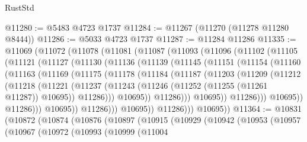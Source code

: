 \begin{lexlean}{RustStd}
\begin{coremodule}
@11280 := @5483 @4723 @1737
@11284 := @11267 (@11270 (@11278 @11280 @8444))
@11286 := @5033 @4723 @1737
@11287 := @11284 @11286
@11335 := @11069
    (@11072
      (@11078
        (@11081
          (@11087
            (@11093
              (@11096
                (@11102
                  (@11105
                    (@11121
                      (@11127
                        (@11130
                          (@11136
                            (@11139
                              (@11145
                                (@11151
                                  (@11154
                                    (@11160
                                      (@11163
                                        (@11169
                                          (@11175
                                            (@11178
                                              (@11184
                                                (@11187
                                                  (@11203
                                                    (@11209
                                                      (@11212
                                                        (@11218
                                                          (@11221
                                                            (@11237
                                                              (@11243
                                                                (@11246
                                                                  (@11252
                                                                    (@11255 (@11261 @11287))
                                                                    @10695))
                                                                @11286)))
                                                          @10695))
                                                      @11286)))
                                                @10695))
                                            @11286)))
                                      @10695))
                                  @11286)))
                            @10695))
                        @11286)))
                  @10695))
              @11286)))
        @10695))
@11364 := @10831
    (@10872
      (@10874
        (@10876
          (@10897
            (@10915
              (@10929
                (@10942
                  (@10953
                    (@10957
                      (@10967
                        (@10972
                          (@10993
                            (@10999
                              (@11004

\end{coremodule}
\end{lexlean}
